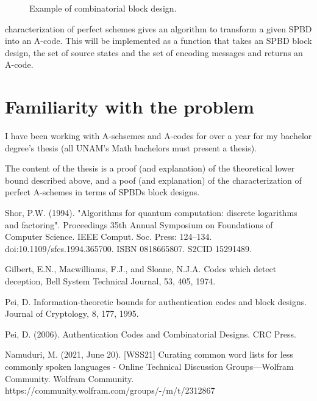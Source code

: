 \documentclass[conference]{IEEEtran}
\begin{document}
\begin{figure}[htbp]
    \centerline{
    }
    \caption{Example of combinatorial block design.}
    \label{block_design}
\end{figure}

\cite{b4} characterization of perfect schemes gives an algorithm to transform a given SPBD into an A-code. This will be implemented as a function that takes an SPBD block design, the set of source states and the set of encoding messages and returns an A-code.

\newpage
%
%
\section{Familiarity with the problem}
I have been working with A-schsemes and A-codes for over a year for my bachelor degree's thesis (all UNAM's Math bachelors must present a thesis).

The content of the thesis is a proof (and explanation) of the theoretical lower bound described above, and a poof (and explanation) of the characterization of perfect A-schemes in terms of SPBDs block designs.

%
%
\begin{thebibliography}{00}
     Shor, P.W. (1994). "Algorithms for quantum computation: discrete logarithms and factoring". Proceedings 35th Annual Symposium on Foundations of Computer Science. IEEE Comput. Soc. Press: 124–134. doi:10.1109/sfcs.1994.365700. ISBN 0818665807. S2CID 15291489.

     Gilbert, E.N., Macwilliams, F.J., and Sloane, N.J.A. Codes which detect deception, Bell System Technical Journal, 53, 405, 1974.

     Pei, D. Information-theoretic bounds for authentication codes and block designs. Journal of Cryptology, 8, 177, 1995.

     Pei, D. (2006). Authentication Codes and Combinatorial Designs. CRC Press.

     Namuduri, M. (2021, June 20). [WSS21] Curating common word lists for less commonly spoken languages - Online Technical Discussion Groups—Wolfram Community. Wolfram Community. https://community.wolfram.com/groups/-/m/t/2312867
\end{thebibliography}
\end{document}
